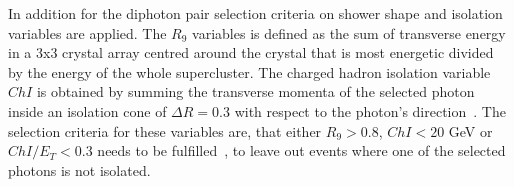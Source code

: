



In addition for the diphoton pair selection criteria on shower shape and isolation variables are applied. The $R_9$ variables is defined as the sum of transverse energy in a 3x3 crystal
array centred around the crystal that is most energetic divided by the energy of the whole supercluster. The charged hadron isolation variable $ChI$ is obtained by summing the transverse momenta
of the selected photon inside an isolation cone of $\Delta R = 0.3$ with respect to the photon's direction~\cite{CMS:2021egamma}. The selection criteria for these variables are, that either $R_9 > 0.8$, $ChI < 20$ GeV or $ChI/E_T < 0.3$
needs to be fulfilled~\cite{Run2analysisnote}, to leave out events where one of the selected photons is not isolated. \\

